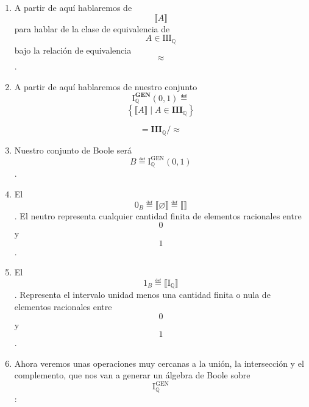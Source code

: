 \documentclass[
]{article}
\providecommand{\tightlist}{%
  \setlength{\itemsep}{0pt}\setlength{\parskip}{0pt}}
\begin{document}
\begin{enumerate}
\begin{enumerate}
\begin{enumerate}
\begin{enumerate}
        \begin{enumerate}
        \def\labelenumv{\arabic{enumv}.}
        \tightlist
        \item
          \[\#{\left( {A\bigtriangleup B} \right) = n_{1} \in {\overset{\sim}{\mathbb{N}} \land \#}}{\left( {B\bigtriangleup C} \right) = n_{2} \in {\mathbb{N}}_{0}}.\Rightarrow.\#{\left( {A\bigtriangleup C} \right) \leq {n_{1} + n_{2}} \in {\mathbb{N}}_{0}}\].
          Y queda de\-mostrada la propiedad transitiva.
        \end{enumerate}
      \end{enumerate}
    \item
      A partir de aquí hablaremos de \[⟦A⟧\]para hablar de la clase de
      equivalencia de \[A \in \mathbf{\mathrm{III}}_{\mathbb{Q}}\]bajo
      la relación de equivalencia \[\approx\].
    \item
      A partir de aquí hablaremos de nuestro conjunto
      \[\mathbf{\mathrm{I}}_{\mathbb{Q}}^{\mathbf{GEN}}(0,1) ≝ {}\]
      \[\left\{ {{⟦A⟧} \mid {A \in \mathbf{III}_{\mathbb{Q}}}} \right\}\]

      \[{} = {\mathbf{III}_{\mathbb{Q}}/ \approx}\]
    \item
      Nuestro conjunto de Boole será
      \[B ≝ {\mathbf{\mathrm{I}}_{\mathbb{Q}}^{\mathbf{\mathrm{GEN}}}(0,1)}\].
    \item
      El \[0_{B}≝{⟦\varnothing ⟧}≝{⟦⟧}\]. El neutro representa cualquier
      cantidad finita de elementos racionales entre \[0\] y \[1\].
    \item
      El \[1_{B}≝{⟦\mathbf{\mathrm{I}}_{\mathbb{Q}}⟧}\]. Representa el
      intervalo unidad menos una cantidad finita o nula de elementos
      racionales entre \[0\] y \[1\].
    \item
      Ahora veremos unas operaciones muy cercanas a la unión, la
      intersección y el com\-plemento, que nos van a generar un álgebra
      de Boole sobre
      \[\mathbf{\mathrm{I}}_{\mathbb{Q}}^{\mathbf{\mathrm{GEN}}}\]:


\end{enumerate}
\end{enumerate}
\end{enumerate}
\end{document}
